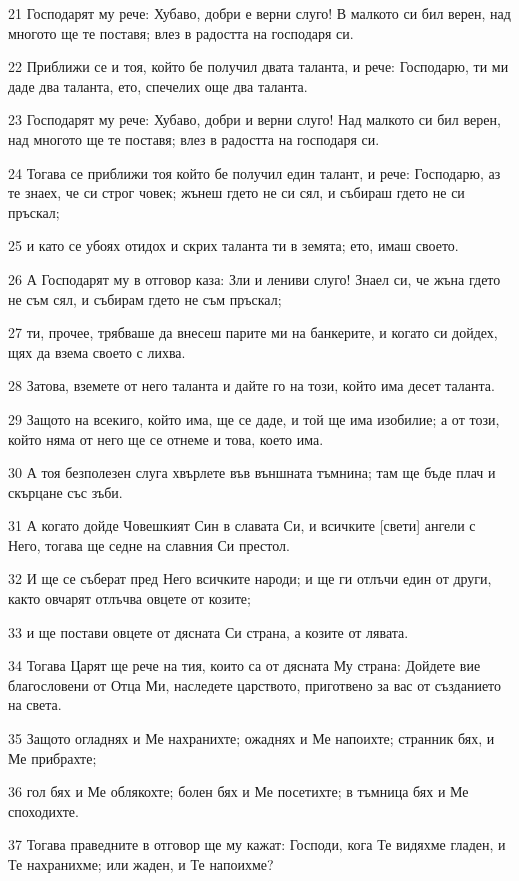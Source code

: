 \par 21 Господарят му рече: Хубаво, добри е верни слуго! В малкото си бил верен, над многото ще те поставя; влез в радостта на господаря си.
\par 22 Приближи се и тоя, който бе получил двата таланта, и рече: Господарю, ти ми даде два таланта, ето, спечелих още два таланта.
\par 23 Господарят му рече: Хубаво, добри и верни слуго! Над малкото си бил верен, над многото ще те поставя; влез в радостта на господаря си.
\par 24 Тогава се приближи тоя който бе получил един талант, и рече: Господарю, аз те знаех, че си строг човек; жънеш гдето не си сял, и събираш гдето не си пръскал;
\par 25 и като се убоях отидох и скрих таланта ти в земята; ето, имаш своето.
\par 26 А Господарят му в отговор каза: Зли и лениви слуго! Знаел си, че жъна гдето не съм сял, и събирам гдето не съм пръскал;
\par 27 ти, прочее, трябваше да внесеш парите ми на банкерите, и когато си дойдех, щях да взема своето с лихва.
\par 28 Затова, вземете от него таланта и дайте го на този, който има десет таланта.
\par 29 Защото на всекиго, който има, ще се даде, и той ще има изобилие; а от този, който няма от него ще се отнеме и това, което има.
\par 30 А тоя безполезен слуга хвърлете във външната тъмнина; там ще бъде плач и скърцане със зъби.
\par 31 А когато дойде Човешкият Син в славата Си, и всичките [свети] ангели с Него, тогава ще седне на славния Си престол.
\par 32 И ще се съберат пред Него всичките народи; и ще ги отлъчи един от други, както овчарят отлъчва овцете от козите;
\par 33 и ще постави овцете от дясната Си страна, а козите от лявата.
\par 34 Тогава Царят ще рече на тия, които са от дясната Му страна: Дойдете вие благословени от Отца Ми, наследете царството, приготвено за вас от създанието на света.
\par 35 Защото огладнях и Ме нахранихте; ожаднях и Ме напоихте; странник бях, и Ме прибрахте;
\par 36 гол бях и Ме облякохте; болен бях и Ме посетихте; в тъмница бях и Ме споходихте.
\par 37 Тогава праведните в отговор ще му кажат: Господи, кога Те видяхме гладен, и Те нахранихме; или жаден, и Те напоихме?
